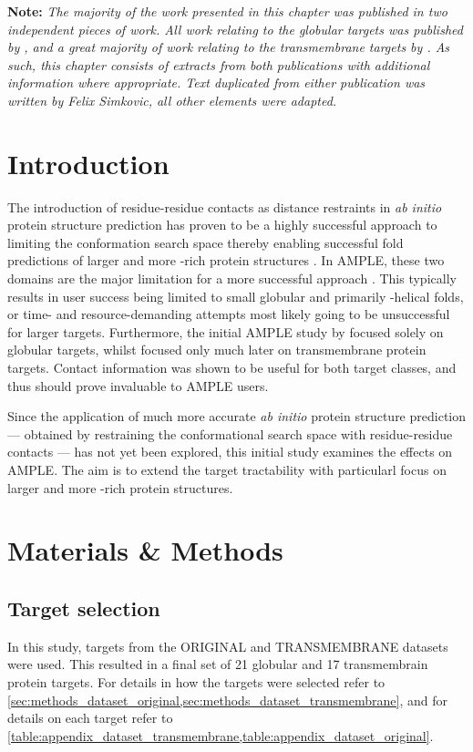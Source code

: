 \textbf{Note: }\textit{The majority of the work presented in this chapter was published in two independent pieces of work. All work relating to the globular targets was published by \textcite{Simkovic2016-wk}, and a great majority of work relating to the transmembrane targets by \textcite{Thomas2017-sh}. As such, this chapter consists of extracts from both publications with additional information where appropriate. Text duplicated from either publication was written by Felix Simkovic, all other elements were adapted.}

\section{Introduction}
The introduction of residue-residue contacts as distance restraints in \textit{ab initio} protein structure prediction has proven to be a highly successful approach to limiting the conformation search space thereby enabling successful fold predictions of larger and more \textbeta-rich protein structures \cite[e.g.,][]{Marks2011-os,Michel2014-eg,Kosciolek2014-bt,Ovchinnikov2015-tn,Ovchinnikov2016-jj,Michel2017-xh,De_Oliveira2017-sg,Ovchinnikov2017-nd,Wang2017-rx}. In AMPLE, these two domains are the major limitation for a more successful approach \cite{Bibby2012-lm}. This typically results in user success being limited to small globular and primarily \textalpha-helical folds, or time- and resource-demanding attempts most likely going to be unsuccessful for larger targets. Furthermore, the initial AMPLE study by \textcite{Bibby2012-lm} focused solely on globular targets, whilst \textcite{Thomas2017-qu} focused only much later on transmembrane protein targets. Contact information was shown to be useful for both target classes, and thus should prove invaluable to AMPLE users.

Since the application of much more accurate \textit{ab initio} protein structure prediction --- obtained by restraining the conformational search space with residue-residue contacts --- has not yet been explored, this initial study examines the effects on AMPLE. The aim is to extend the target tractability with particularl focus on larger and more \textbeta-rich protein structures.

\section{Materials \& Methods}
\subsection{Target selection}
In this study, targets from the ORIGINAL and TRANSMEMBRANE datasets were used. This resulted in a final set of 21 globular and 17 transmembrain protein targets. For details in how the targets were selected refer to \cref{sec:methods_dataset_original,sec:methods_dataset_transmembrane}, and for details on each target refer to \cref{table:appendix_dataset_transmembrane,table:appendix_dataset_original}.


